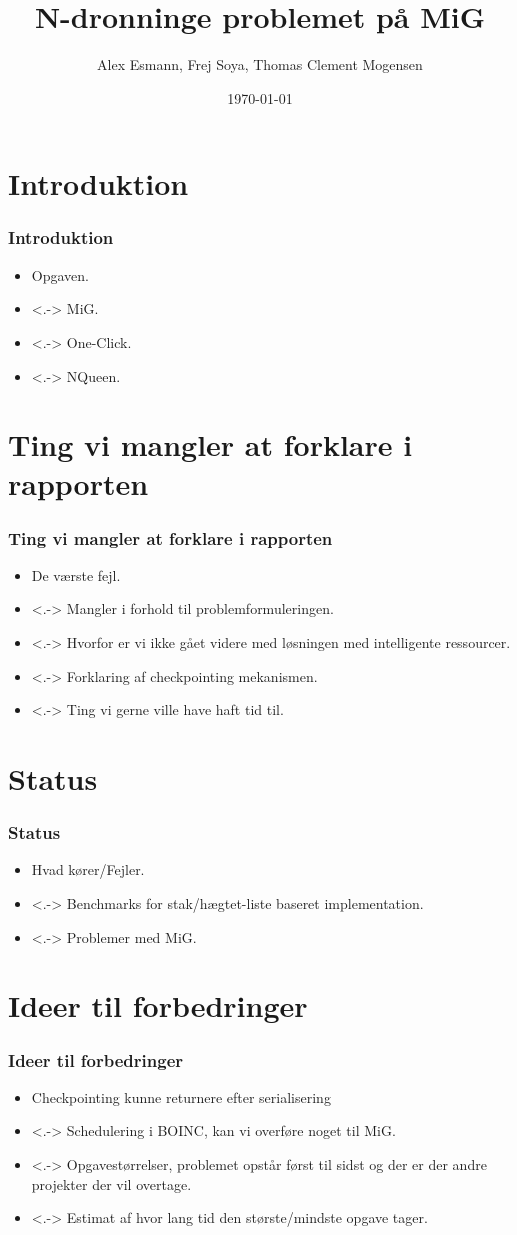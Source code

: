 \documentclass{beamer}
\title{N-dronninge problemet på MiG}
\author{Alex Esmann, Frej Soya, Thomas Clement Mogensen}
\date{\today}
\begin{document}
\frame{\titlepage}
\frame{\tableofcontents}
\section{Introduktion}
\frame
{
	\frametitle{Introduktion}

	\begin{itemize}
	\item<1-> Opgaven.
	\item<.-> MiG.
	\item<.-> One-Click.
	\item<.-> NQueen.
	\end{itemize}
}


\section{Ting vi mangler at forklare i rapporten}
\frame
{
  \frametitle{Ting vi mangler at forklare i rapporten}

  \begin{itemize}
  \item<1-> De værste fejl.
  \item<.-> Mangler i forhold til problemformuleringen.
  \item<.-> Hvorfor er vi ikke gået videre med løsningen med intelligente	ressourcer.      
	\item<.-> Forklaring af checkpointing mekanismen.
	\item<.-> Ting vi gerne ville have haft tid til.
  \end{itemize}
}

\section{Status}
\frame
{
  \frametitle{Status}

  \begin{itemize}
  \item<1-> Hvad kører/Fejler.
  \item<.-> Benchmarks for stak/hægtet-liste baseret implementation.
  \item<.-> Problemer med MiG.      
  \end{itemize}
}

\section{Ideer til forbedringer}
\frame
{
  \frametitle{Ideer til forbedringer}

  \begin{itemize}
  \item<1-> Checkpointing kunne returnere efter serialisering
  \item<.-> Schedulering i BOINC, kan vi overføre noget til MiG.
  \item<.-> Opgavestørrelser, problemet opstår først til sidst og der er der andre projekter der vil overtage.      
	\item<.-> Estimat af hvor lang tid den største/mindste opgave tager. 
  \end{itemize}
}
\end{document}
